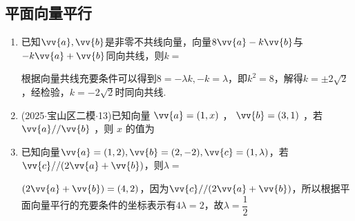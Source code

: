 \subsection*{平面向量平行}
\begin{enumerate}
    \item 已知$\vv{a}, \vv{b}$是非零不共线向量，向量$8\vv{a} - k \vv{b}$与$-k\vv{a} + \vv{b}$同向共线，则$k = $ 
        \begin{jieda}
            根据向量共线充要条件可以得到$8 = -\lambda k, -k = \lambda$，即$k^2 = 8$，解得$k = \pm 2\sqrt{2}$，经检验，$k = -2\sqrt{2}$时同向共线.
        \end{jieda}
    \item (2025$\cdot$宝山区二模$\cdot$13)已知向量 $\vv{a} = \left( {1,x}\right)$ ， $\vv{b} = \left( {3,1}\right)$ ，若 $\vv{a}//\vv{b}$ ，则 $x$ 的值为 

    \item 已知向量$\vv{a} = (1, 2), \vv{b} = (2, -2), \vv{c} = (1, \lambda)$，若$\vv{c} // (2\vv{a} + \vv{b})$，则$\lambda = $
    \begin{jieda}
        $(2\vv{a} + \vv{b}) = (4, 2)$，因为$\vv{c} // (2\vv{a} + \vv{b})$，所以根据平面向量平行的充要条件的坐标表示有$4\lambda = 2$，故$\lambda = \dfrac{1}{2}$
    \end{jieda}
\end{enumerate}
